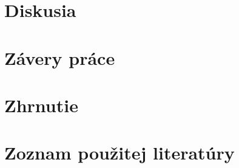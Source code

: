 \documentclass[12pt,a4paper]{article}
\begin{document}
\section{Diskusia}


\section{Závery práce}


\section{Zhrnutie}


\section{Zoznam použitej literatúry}
\thispagestyle{empty}

\end{document}
